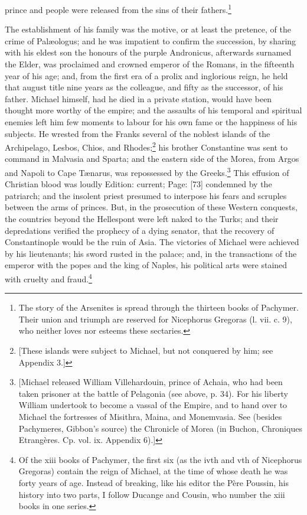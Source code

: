 prince and people were released from the sins of their fathers.\footnote{The story of the Arsenites is spread through the thirteen books of Pachymer. Their union and triumph are reserved for Nicephorus Gregoras (l. vii. c. 9), who neither loves nor esteems these sectaries.}

The establishment of his family was the motive, or at least the pretence, of the crime of Palæologus; and he was impatient to confirm the succession, by sharing with his eldest son the honours of the purple Andronicus, afterwards surnamed the Elder, was proclaimed and crowned emperor of the Romans, in the fifteenth year of his age; and, from the first era of a prolix and inglorious reign, he held that august title nine years as the colleague, and fifty as the successor, of his father. Michael himself, had he died in a private station, would have been thought more worthy of the empire; and the assaults of his temporal and spiritual enemies left him few moments to labour for his own fame or the happiness of his subjects. He wrested from the Franks several of the noblest islands of the Archipelago, Lesbos, Chios, and Rhodes;\footnote{[These islands were subject to Michael, but not conquered by him; see Appendix 3.]} his brother Constantine was sent to command in Malvasia and Sparta; and the eastern side of the Morea, from Argos and Napoli to Cape Tænarus, was repossessed by the Greeks.\footnote{[Michael released William Villehardouin, prince of Achaia, who had been taken prisoner at the battle of Pelagonia (see above, p. 34). For his liberty William undertook to become a vassal of the Empire, and to hand over to Michael the fortresses of Misithra, Maina, and Monemvasia. See (besides Pachymeres, Gibbon\texthebrew{}’s source) the Chronicle of Morea (in Buchon, Chroniques Etrangères. Cp. vol. ix. Appendix 6).]} This effusion of Christian blood was loudly Edition: current; Page: [73] condemned by the patriarch; and the insolent priest presumed to interpose his fears and scruples between the arms of princes. But, in the prosecution of these Western conquests, the countries beyond the Hellespont were left naked to the Turks; and their depredations verified the prophecy of a dying senator, that the recovery of Constantinople would be the ruin of Asia. The victories of Michael were achieved by his lieutenants; his sword rusted in the palace; and, in the transactions of the emperor with the popes and the king of Naples, his political arts were stained with cruelty and fraud.\footnote{Of the xiii books of Pachymer, the first six (as the ivth and vth of Nicephorus Gregoras) contain the reign of Michael, at the time of whose death he was forty years of age. Instead of breaking, like his editor the Père Poussin, his history into two parts, I follow Ducange and Cousin, who number the xiii books in one series.}

